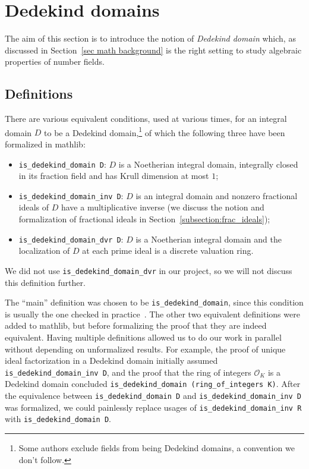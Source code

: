 \documentclass[a4paper,USenglish,cleveref, autoref, thm-restate]{lipics-v2021}
\newcommand{\lean}[1]{\texttt{#1}\xspace} %
\newcommand*{\OK}[1][K]{\mathcal{O}_{#1}}
\newcommand{\mathlib}{\textsf{mathlib}\xspace}
\begin{document}
\section{Dedekind domains} \label{sec:Dedekind-domain}
The aim of this section is to introduce the notion of \emph{Dedekind domain} which, as discussed in Section~\ref{sec math background} is the right setting to study algebraic properties of number fields.
\subsection{Definitions}\label{subsec:definitions_DD}
There are various equivalent conditions, used at various times, for an integral domain $D$ to be a Dedekind domain,\footnote{Some authors exclude fields from being Dedekind domains, a convention we don't follow.}
of which the following three have been formalized in \mathlib:
\begin{itemize}
\item \lean{is\_dedekind\_domain D}: $D$ is a Noetherian integral domain, integrally closed in its fraction field and has Krull dimension at most $1$;
\item \lean{is\_dedekind\_domain\_inv D}: $D$ is an integral domain and nonzero fractional ideals of $D$ have a multiplicative inverse (we discuss the notion and formalization of fractional ideals in Section~\ref{subsection:frac_ideals});
\item \lean{is\_dedekind\_domain\_dvr D}: $D$ is a Noetherian integral domain and the localization of $D$ at each prime ideal is a discrete valuation ring.
\end{itemize}
We did not use \lean{is\_dedekind\_domain\_dvr} in our project, so we will not discuss this definition further.


The ``main'' definition was chosen to be \lean{is\_dedekind\_domain},
since this condition is usually the one checked in practice~\cite{Neukirch}.
The other two equivalent definitions were added to \mathlib, but before formalizing the proof that they are indeed equivalent.
Having multiple definitions allowed us to do our work in parallel without depending on unformalized results.
For example,
the proof of unique ideal factorization in a Dedekind domain initially assumed \lean{is\_dedekind\_domain\_inv D},
and the proof that the ring of integers $\OK$ is a Dedekind domain concluded \lean{is\_dedekind\_domain (ring\_of\_integers K)}.
After the equivalence between \lean{is\_dedekind\_domain D} and \lean{is\_dedekind\_domain\_inv D} was formalized,
we could painlessly replace usages of \lean{is\_dedekind\_domain\_inv R} with \lean{is\_dedekind\_domain D}.
\end{document}
